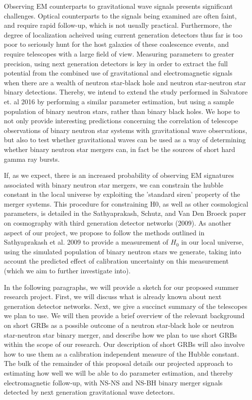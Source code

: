 \documentclass{article}
\begin{document}
Observing EM counterparts to gravitational wave signals presents significant challenges.  Optical counterparts to the signals being examined are often faint, and require rapid follow-up, which is not usually practical.  Furthermore, the degree of localization acheived using current generation detectors thus far is too poor to seriously hunt for the host galaxies of these coalescence events, and require telescopes with a large field of view.  Measuring parameters to greater precision, using next generation detectors is key in order to extract the full potential from the combined use of gravitational and electromagnetic signals when there are a wealth of neutron star-black hole and neutron star-neutron star binary detections. Thereby, we intend to extend the study performed in Salvatore et. al 2016 by performing a similar parameter estimation, but using a sample population of binary neutron stars, rather than binary black holes.  We hope to not only provide interesting predictions concerning the correlation of telescope observations of binary neutron star systems with gravitational wave observations, but also to test whether gravitational waves can be used as a way of determining whether binary neutron star mergers can, in fact be the sources of short hard gamma ray bursts.

If, as we expect, there is an increased probability of observing EM signatures associated with binary neutron star mergers, we can constrain the hubble constant in the local universe by exploiting the 'standard siren' property of the merger systems.  This procedure for constraining H0, as well as other cosmological parameters, is detailed in the Sathyaprakash, Schutz, and Van Den Broeck paper on cosmography with third generation detector networks (2009).  As another aspect of our project, we propose to follow the methods outlined in Sathyaprakash et al. 2009 to provide a measurement of $H_0$ in our local universe, using the simulated population of binary neutron stars we generate, taking into account the predicted effect of calibration uncertainty on this measurement (which we aim to further investigate into).

In the following paragraphs, we will provide a sketch for our proposed summer research project.  First, we will discuss what is already known about next generation detector networks.  Next, we give a succinct summary of the telescopes we plan to use.  We will then provide a brief overview of the relevant background on short GRBs as a possible outcome of a neutron star-black hole or neutron star-neutron star binary merger, and describe how we plan to use short GRBs within the scope of our research.  Our description of short GRBs will also involve how to use them as a calibration independent measure of the Hubble constant. The bulk of the remainder of this proposal details our projected approach to estimating how well we will be able to do parameter estimation, and thereby electromagnetic follow-up, with NS-NS and NS-BH binary merger signals detected by next generation gravitational wave detectors.
\end{document}

